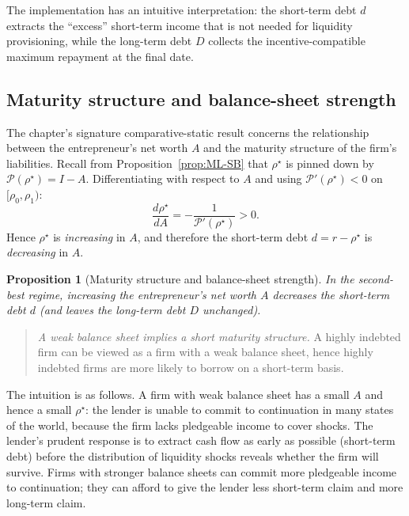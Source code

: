 \documentclass[11pt,a4paper,oneside]{book}
\theoremstyle{plain}
\newtheorem{proposition}[theorem]{Proposition}
\theoremstyle{definition}
\theoremstyle{remark}
\numberwithin{equation}{chapter}
\begin{document}
The implementation has an intuitive interpretation: the short-term debt $d$ extracts the ``excess'' short-term income that is not needed for liquidity provisioning, while the long-term debt $D$ collects the incentive-compatible maximum repayment at the final date.

\subsection{Maturity structure and balance-sheet strength}

The chapter's signature comparative-static result concerns the relationship between the entrepreneur's net worth $A$ and the maturity structure of the firm's liabilities.
Recall from Proposition~\ref{prop:ML-SB} that $\rho^\star$ is pinned down by $\mathcal{P}(\rho^\star) = I - A$.
Differentiating with respect to $A$ and using $\mathcal{P}'(\rho^\star) < 0$ on $[\rho_0, \rho_1)$:
\begin{equation*}
  \frac{d \rho^\star}{d A} = -\frac{1}{\mathcal{P}'(\rho^\star)} > 0.
\end{equation*}
Hence $\rho^\star$ is \emph{increasing} in $A$, and therefore the short-term debt $d = r - \rho^\star$ is \emph{decreasing} in $A$.

\begin{proposition}[Maturity structure and balance-sheet strength]\label{prop:ML-maturity}
In the second-best regime, increasing the entrepreneur's net worth $A$ decreases the short-term debt $d$ (and leaves the long-term debt $D$ unchanged).
\end{proposition}

\begin{quote}
\emph{A weak balance sheet implies a short maturity structure.}
A highly indebted firm can be viewed as a firm with a weak balance sheet, hence highly indebted firms are more likely to borrow on a short-term basis.
\end{quote}

The intuition is as follows.
A firm with weak balance sheet has a small $A$ and hence a small $\rho^\star$: the lender is unable to commit to continuation in many states of the world, because the firm lacks pledgeable income to cover shocks.
The lender's prudent response is to extract cash flow as early as possible (short-term debt) before the distribution of liquidity shocks reveals whether the firm will survive.
Firms with stronger balance sheets can commit more pledgeable income to continuation; they can afford to give the lender less short-term claim and more long-term claim.
\end{document}

